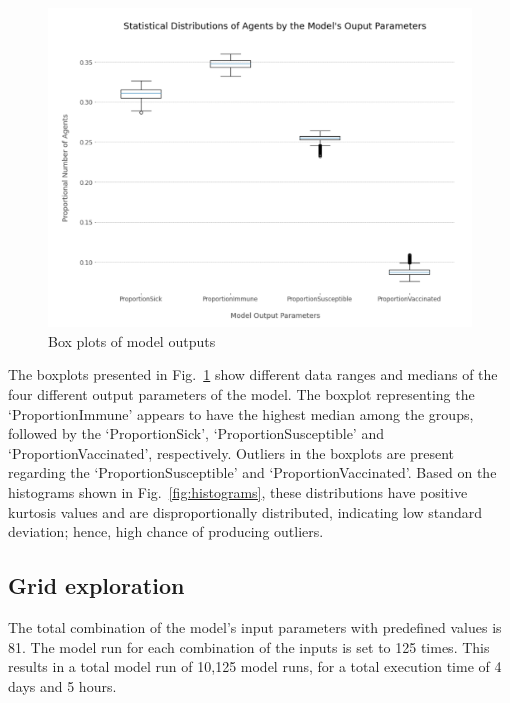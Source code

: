 \documentclass[smallextended]{svjour3}       %
\begin{document}
\begin{figure}
	\centering
	\includegraphics[width=0.6\linewidth]{figures/agentTypeDistrib.png}
	\caption{Box plots of model outputs\label{fig:agenttypedistrib}}
\end{figure}


The boxplots presented in Fig.~\ref{fig:agenttypedistrib} show different data ranges and medians of the four different output parameters of the model. The boxplot representing the ‘ProportionImmune’ appears to have the highest median among the groups, followed by the ‘ProportionSick’, ‘ProportionSusceptible’ and ‘ProportionVaccinated’, respectively. Outliers in the boxplots are present regarding the ‘ProportionSusceptible’ and ‘ProportionVaccinated’. Based on the histograms shown in Fig.~\ref{fig:histograms}, these distributions have positive kurtosis values and are disproportionally distributed, indicating low standard deviation; hence, high chance of producing outliers.


\subsection{Grid exploration}

The total combination of the model's input parameters with predefined values is 81. The model run for each combination of the inputs is set to 125 times. This results in a total model run of 10,125 model runs, for a total execution time of 4 days and 5 hours.

\end{document}
